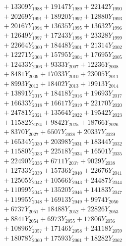 \documentclass[a4paper,10pt]{article}
\begin{document}
{\begin{align}
&\;  + 13309 Y_{1988} + 19147 Y_{1989} + 22142 Y_{1990} \\[0.3ex]
&\;  + 20269 Y_{1991} + 18920 Y_{1992} + 12880 Y_{1993} \\[0.3ex]
&\;  + 20167 Y_{1994} + 13635 Y_{1995} + 13632 Y_{1996} \\[0.3ex]
&\;  + 12649 Y_{1997} + 17243 Y_{1998} + 23328 Y_{1999} \\[0.3ex]
&\;  + 22664 Y_{2000} + 18448 Y_{2001} + 21314 Y_{2002} \\[0.3ex]
&\;  + 12271 Y_{2003} + 15795 Y_{2004} + 17695 Y_{2005} \\[0.3ex]
&\;  + 12433 Y_{2006} + 9333 Y_{2007} + 12236 Y_{2008} \\[0.5ex]\allowbreak
&\;  + 8481 Y_{2009} + 17033 Y_{2010} + 23005 Y_{2011} \\[0.3ex]
&\;  + 8993 Y_{2012} + 18402 Y_{2013} + 19913 Y_{2014} \\[0.3ex]
&\;  + 13891 Y_{2015} + 18418 Y_{2016} + 19693 Y_{2017} \\[0.3ex]
&\;  + 16633 Y_{2018} + 16617 Y_{2019} + 22170 Y_{2020} \\[0.3ex]
&\;  + 24781 Y_{2021} + 13564 Y_{2022} + 19542 Y_{2023} \\[0.3ex]
&\;  + 11582 Y_{2024} + 9842 Y_{2025} + 18766 Y_{2026} \\[0.3ex]
&\;  + 8370 Y_{2027} + 6507 Y_{2028} + 20337 Y_{2029} \\[0.3ex]
&\;  + 16534 Y_{2030} + 20398 Y_{2031} + 18344 Y_{2032} \\[0.3ex]
&\;  + 11580 Y_{2033} + 22518 Y_{2034} + 16501 Y_{2035} \\[0.3ex]
&\;  + 22490 Y_{2036} + 6711 Y_{2037} + 9029 Y_{2038} \\[0.5ex]\allowbreak
&\;  + 12733 Y_{2039} + 15736 Y_{2040} + 22676 Y_{2041} \\[0.3ex]
&\;  + 12505 Y_{2042} + 10566 Y_{2043} + 24487 Y_{2044} \\[0.3ex]
&\;  + 11099 Y_{2045} + 13520 Y_{2046} + 14183 Y_{2047} \\[0.3ex]
&\;  + 11995 Y_{2048} + 16913 Y_{2049} + 9974 Y_{2050} \\[0.3ex]
&\;  + 6737 Y_{2051} + 18488 Y_{2052} + 22826 Y_{2053} \\[0.3ex]
&\;  + 8841 Y_{2054} + 6973 Y_{2055} + 17806 Y_{2056} \\[0.3ex]
&\;  + 10896 Y_{2057} + 17146 Y_{2058} + 24118 Y_{2059} \\[0.3ex]
&\;  + 18078 Y_{2060} + 17593 Y_{2061} + 18282 Y_{2062} \\[0.3ex]

\end{align}}
\end{document}
